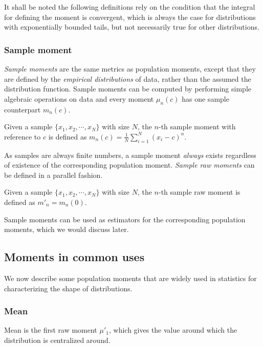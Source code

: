 It shall be noted the following definitions rely on the condition that the integral for defining the moment is convergent, which is always the case for distributions with exponentially bounded tails, but not necessarily true for other distributions. 

\subsubsection{Sample moment}
\textit{Sample moments} are the same metrics as population moments, except that they are defined by the \textit{empirical distributions} of data, rather than the assumed the distribution function. Sample moments can be computed by performing simple algebraic operations on data and every moment $ \mu_n(c) $ has one sample counterpart $ m_n(c) $.

\begin{defn}
Given a sample $ \{x_1, x_2, \cdots, x_N\} $ with size $ N $, the $ n $-th sample moment with reference to $ c $ is defined as $ m_n(c) = \frac{1}{N} \sum_{i=1}^N (x_i-c)^n $.
\end{defn}

As samples are always finite numbers, a sample moment \textit{always} exists regardless of existence of the corresponding population moment. \textit{Sample raw moments} can be defined in a parallel fashion.

\begin{defn}
Given a sample $ \{x_1, x_2, \cdots, x_N\} $ with size $ N $, the $ n $-th sample raw moment is defined as $ m'_n = m_n(0) $.  
\end{defn}

Sample moments can be used as estimators for the corresponding population moments, which we would discuss later.

\subsection{Moments in common uses}
We now describe some population moments that are widely used in statistics for characterizing the shape of distributions. 

\subsubsection{Mean}
Mean is the first raw moment $ \mu'_1 $, which gives the value around which the distribution is centralized around.

